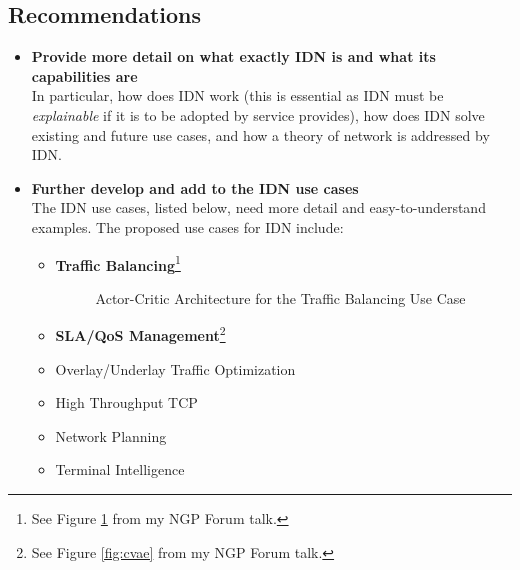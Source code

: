 \documentclass[11pt, oneside]{article}   	%
\begin{document}
\subsection{Recommendations}
\label{sec:recommendations}
\begin{itemize}
\item \textbf{Provide more detail on what exactly IDN is and what its capabilities are} \\
In particular,  how does IDN work (this is essential as IDN must be \emph{explainable} if it is to be adopted by service provides), how does IDN solve existing and future use cases,
and how a theory of network is addressed by IDN.

\item \textbf{Further develop and add to the IDN use cases} \\
The IDN use cases, listed below, need more detail and easy-to-understand examples. The proposed use cases for IDN include:
\begin{itemize}
\item \textbf{Traffic Balancing}\footnote{See Figure \ref{fig:ac} from my NGP Forum talk.}
\begin{figure}
\caption{Actor-Critic Architecture for the Traffic Balancing Use Case}
\label{fig:ac}
\end{figure}

\item \textbf{SLA/QoS Management}\footnote{See Figure \ref{fig:cvae} from my NGP Forum talk.}
\item Overlay/Underlay Traffic Optimization
\item High Throughput TCP 
\item Network Planning
\item Terminal Intelligence
\end{itemize}


\end{itemize}
\end{document}
